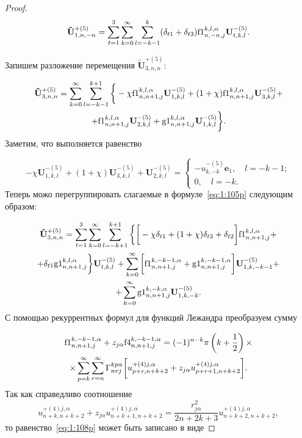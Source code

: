 \begin{russian}
\begin{proof}
\begin{equation}
\mathbf{\tilde U}_{1,n,-n}^{+(5)}=\sum\limits_{t=1}^3\sum\limits_{k=0}^\infty\sum\limits_{l=-k-1}^{k}(\delta_{t1}+\delta_{t3}){\rm f1}_{n,-n,j}^{k,l,\alpha}\mathbf{U}_{t,k,l}^{-(5)}.
\label{eq:1:104p}
\end{equation}

Запишем разложение перемещения $\mathbf{\tilde U}_{3,n,n}^{+(5)}$:

\begin{multline}\label{eq:1:105p}
\mathbf{\tilde U}_{3,n,n}^{+(5)}=\sum\limits_{k=0}^\infty\sum\limits_{l=-k-1}^{k+1}\bigg\{-\chi{\rm f1}_{n,n+1,j}^{k,l,\alpha}\mathbf{U}_{1,k,l}^{-(5)}+(1+\chi){\rm f1}_{n,n+1,j}^{k,l,\alpha}\mathbf{U}_{3,k,l}^{-(5)}+ \\
+{\rm f1}_{n,n+1,j}^{k,l,\alpha}\mathbf{U}_{2,k,l}^{-(5)}+{\rm g1}_{n,n+1,j}^{k,l,\alpha}\mathbf{U}_{1,k,l}^{-(5)}\bigg\}.
\end{multline}
Заметим, что выполняется равенство

\begin{equation}
-\chi\mathbf{U}_{1,k,l}^{-(5)}+(1+\chi)\mathbf{U}_{3,k,l}^{-(5)}+\mathbf{U}_{2,k,l}^{-(5)}=
\begin{cases}
-u_{k,-k}^{-(5)}\mathbf{e}_1,\quad l=-k-1; \\
0,\quad l=-k.
\end{cases}
\label{eq:1:106p}
\end{equation}
Теперь можо перегруппировать слагаемые в формуле~\eqref{eq:1:105p} следующим образом:

\begin{multline}\label{eq:1:107p}
\mathbf{\tilde U}_{3,n,n}^{+(5)}=\sum\limits_{t=1}^3\sum\limits_{k=0}^\infty\sum\limits_{l=-k+1}^{k+1}\bigg\{\bigg\lbrack-\chi\delta_{t1}+(1+\chi)\delta_{t3}+\delta_{t2}\bigg\rbrack{\rm f1}_{n,n+1,j}^{k,l,\alpha}+ \\
+\delta_{t1}{\rm g1}_{n,n+1,j}^{k,l,\alpha}\bigg\}\mathbf{U}_{t,k,l}^{-(5)}+\sum\limits_{k=0}^\infty\bigg\lbrack{\rm f1}_{n,n+1,j}^{k,-k-1,\alpha}+{\rm g1}_{n,n+1,j}^{k,-k-1,\alpha}\bigg\rbrack\mathbf{U}_{1,k,-k-1}^{-(5)}+ \\
+\sum\limits_{k=0}^\infty{\rm g1}_{n,n+1,j}^{k,-k,\alpha}\mathbf{U}_{1,k,-k}^{-(5)}.
\end{multline}
С помощью рекуррентных формул для функций Лежандра преобразуем сумму

\begin{multline}
{\rm f1}_{n,n+1,j}^{k,-k-1,\alpha}+z_{j\alpha}{\rm f4}_{n,n+1,j}^{k,-k-1,\alpha}=(-1)^{n-k}\pi \left( {k + \frac{1}{2}} \right)\times \\
\times\sum\limits_{p = k}^\infty  \sum\limits_{r = n}^\infty\Gamma _{nrj}^{kp\alpha }\bigg\lbrack{u}_{p+r,n+k+2}^{+(4)j,\alpha}+z_{j\alpha}{u}_{p+r+1,n+k+2}^{ + (4)j,\alpha}\bigg\rbrack.
\label{eq:1:108p}
\end{multline}
Так как справедливо соотношение
$$
{u}_{n+k,n+k+2}^{ + (4)j,\alpha}+z_{j\alpha}{u}_{n+k+1,n+k+2}^{+(4)j,\alpha}=\frac{r_{j\alpha}^2}{2n+2k+3}u_{n+k+2,n+k+2}^{+(4)j,\alpha},
$$
то равенство~\eqref{eq:1:108p} может быть записано в виде


\end{proof}
\end{russian}
